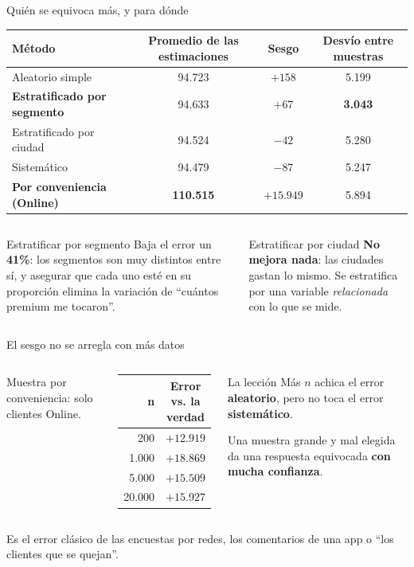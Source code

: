 \documentclass[aspectratio=169,10pt]{beamer}
\begin{document}
\begin{frame}{Quién se equivoca más, y para dónde}
\begin{center}
\begin{tabular}{lccc}
\toprule
\textbf{Método} & \textbf{Promedio de las estimaciones} & \textbf{Sesgo} & \textbf{Desvío entre muestras} \\
\midrule
Aleatorio simple & 94.723 & $+158$ & 5.199 \\
\textbf{Estratificado por segmento} & 94.633 & $+67$ & \textbf{3.043} \\
Estratificado por ciudad & 94.524 & $-42$ & 5.280 \\
Sistemático & 94.479 & $-87$ & 5.247 \\
\textbf{Por conveniencia (Online)} & \textbf{110.515} & \textbf{$+15.949$} & 5.894 \\
\bottomrule
\end{tabular}
\end{center}
\vspace{0.2cm}
\begin{columns}[T]
\begin{block}{Estratificar por segmento}
Baja el error un \textbf{41\%}: los segmentos son muy distintos entre sí, y asegurar que cada uno esté en su proporción elimina la variación de ``cuántos premium me tocaron''.
\end{block}
\begin{block}{Estratificar por ciudad}
\textbf{No mejora nada}: las ciudades gastan lo mismo. Se estratifica por una variable \emph{relacionada} con lo que se mide.
\end{block}
\end{columns}
\end{frame}

\begin{frame}{El sesgo no se arregla con más datos}
\begin{columns}[c]
Muestra por conveniencia: solo clientes Online.
\begin{center}
\begin{tabular}{rc}
\toprule
\textbf{n} & \textbf{Error vs. la verdad} \\
\midrule
200 & $+12.919$ \\
1.000 & $+18.869$ \\
5.000 & $+15.509$ \\
20.000 & $+15.927$ \\
\bottomrule
\end{tabular}
\end{center}
\begin{alertblock}{La lección}
Más $n$ achica el error \textbf{aleatorio}, pero no toca el error \textbf{sistemático}.

Una muestra grande y mal elegida da una respuesta equivocada \textbf{con mucha confianza}.
\end{alertblock}
\end{columns}
\vspace{0.2cm}
\small Es el error clásico de las encuestas por redes, los comentarios de una app o ``los clientes que se quejan''.
\end{frame}
\end{document}
